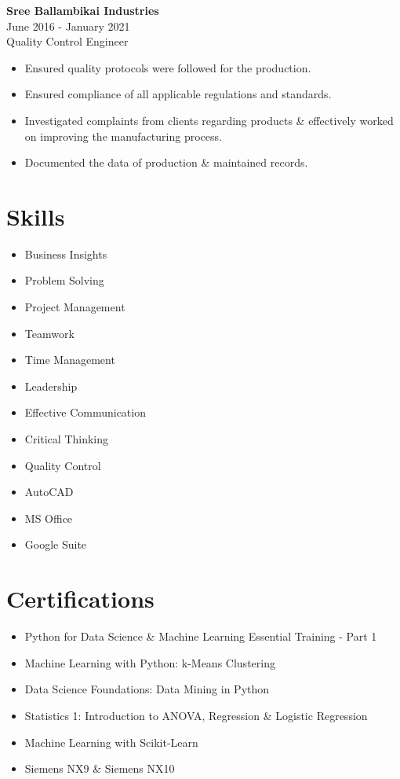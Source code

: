 \documentclass[a4paper,10pt]{article}
\begin{document}
\begin{multicols}{2}
\noindent
\textbf{Sree Ballambikai Industries} \\
\hfill June 2016 - January 2021 \\
Quality Control Engineer
\begin{itemize}
    \item Ensured quality protocols were followed for the production.
    \item Ensured compliance of all applicable regulations and standards.
    \item Investigated complaints from clients regarding products \& effectively worked on improving the manufacturing process.
    \item Documented the data of production \& maintained records.
\end{itemize}

\columnbreak
\section*{Skills}
\begin{itemize}
    \item Business Insights
    \item Problem Solving
    \item Project Management
    \item Teamwork
    \item Time Management
    \item Leadership
    \item Effective Communication
    \item Critical Thinking
    \item Quality Control
    \item AutoCAD
    \item MS Office
    \item Google Suite
\end{itemize}

\section*{Certifications}
\begin{itemize}
    \item Python for Data Science \& Machine Learning Essential Training - Part 1
    \item Machine Learning with Python: k-Means Clustering
    \item Data Science Foundations: Data Mining in Python
    \item Statistics 1: Introduction to ANOVA, Regression \& Logistic Regression
    \item Machine Learning with Scikit-Learn
    \item Siemens NX9 \& Siemens NX10
\end{itemize}


\end{multicols}
\end{document}
